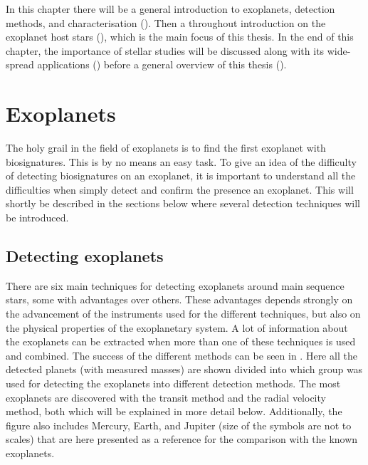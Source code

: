 In this chapter there will be a general introduction to exoplanets, detection methods, and
characterisation (). Then a throughout introduction on the exoplanet host stars
(), which is the main focus of this thesis. In the end of this chapter,
the importance of stellar studies will be discussed along with its wide-spread applications
() before a general overview of this thesis ().



\section{Exoplanets}
\label{sec:exoplanets}

The holy grail in the field of exoplanets is to find the first exoplanet with biosignatures. This is
by no means an easy task. To give an idea of the difficulty of detecting biosignatures on an
exoplanet, it is important to understand all the difficulties when simply detect and confirm the
presence an exoplanet. This will shortly be described in the sections below where several detection
techniques will be introduced.

\subsection{Detecting exoplanets}
\label{sec:detecting_exoplanets}

There are six main techniques for detecting exoplanets around main sequence stars, some with
advantages over others. These advantages depends strongly on the advancement of the instruments used
for the different techniques, but also on the physical properties of the exoplanetary system. A lot
of information about the exoplanets can be extracted when more than one of these techniques is used
and combined. The success of the different methods can be seen in . Here
all the detected planets (with measured masses) are shown divided {into which group was used for
detecting the exoplanets} into different detection methods. The most exoplanets are discovered with
the transit method and the radial velocity method, both which will be explained in more detail
below. Additionally, the figure also includes Mercury, Earth, and Jupiter (size of the symbols are
not to scales) that are here presented as a reference for the comparison with the known exoplanets.

